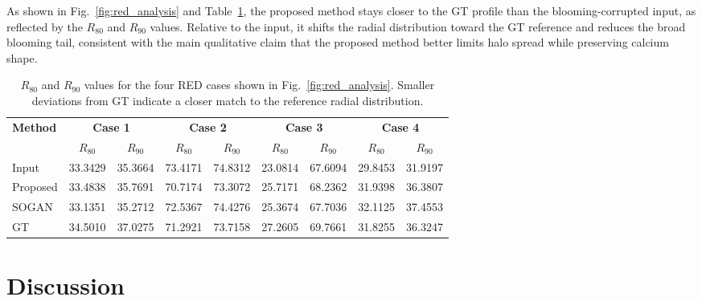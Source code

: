 \documentclass[singleLetter,times]{sagej}
\begin{document}
As shown in Fig.~\ref{fig:red_analysis} and Table~\ref{tab:red_r80_r90}, the proposed method stays closer to the GT profile than the blooming-corrupted input, as reflected by the $R_{80}$ and $R_{90}$ values. Relative to the input, it shifts the radial distribution toward the GT reference and reduces the broad blooming tail, consistent with the main qualitative claim that the proposed method better limits halo spread while preserving calcium shape.

\begin{table}[t]
\centering
\caption{$R_{80}$ and $R_{90}$ values for the four RED cases shown in Fig.~\ref{fig:red_analysis}. Smaller deviations from GT indicate a closer match to the reference radial distribution.}
\label{tab:red_r80_r90}
\small
\setlength{\tabcolsep}{2pt}
\begin{tabular*}{\linewidth}{@{\extracolsep{\fill}}lcccccccc@{}}
\hline
\textbf{Method} & \multicolumn{2}{c}{\textbf{Case 1}} & \multicolumn{2}{c}{\textbf{Case 2}} & \multicolumn{2}{c}{\textbf{Case 3}} & \multicolumn{2}{c}{\textbf{Case 4}} \\
 & \textbf{$R_{80}$} & \textbf{$R_{90}$} & \textbf{$R_{80}$} & \textbf{$R_{90}$} & \textbf{$R_{80}$} & \textbf{$R_{90}$} & \textbf{$R_{80}$} & \textbf{$R_{90}$} \\
\hline
Input    & 33.3429 & 35.3664 & 73.4171 & 74.8312 & 23.0814 & 67.6094 & 29.8453 & 31.9197 \\
Proposed & 33.4838 & 35.7691 & 70.7174 & 73.3072 & 25.7171 & 68.2362 & 31.9398 & 36.3807 \\
SOGAN    & 33.1351 & 35.2712 & 72.5367 & 74.4276 & 25.3674 & 67.7036 & 32.1125 & 37.4553 \\
GT       & 34.5010 & 37.0275 & 71.2921 & 73.7158 & 27.2605 & 69.7661 & 31.8255 & 36.3247 \\
\hline
\end{tabular*}
\end{table}

\section{Discussion}
\end{document}
